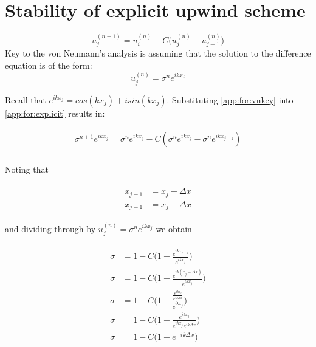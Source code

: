 \section{Stability of explicit upwind scheme}
	\begin{equation}
		\label{app:for:explicit}
		u_j^{(n+1)} = u_i^{(n)} - C\Big(u_j^{(n)} - u_{j-1}^{(n)}\Big)
	\end{equation}
	Key to the von Neumann's analysis is assuming that the solution to the difference equation is of the form:
	\begin{equation}
		\label{app:for:vnkey}
		u_j^{(n)} = \sigma^ne^{ikx_j}
	\end{equation}
	
	Recall that $e^{ikx_j} = cos(kx_j) + isin(kx_j)$. Substituting \ref{app:for:vnkey} into \ref{app:for:explicit} results in:
	
	\begin{align}
		\begin{split}
			\sigma ^{n+1}e^{ikx_j} = \sigma^{n}{e^{ikx_j}} - C(\sigma ^{n}e^{ikx_j} - \sigma ^{n}e^{ikx_{j-1}}) \\
		\end{split}
	\end{align}
	
	Noting that
	
	\begin{align}
		\begin{split}
			x_{j+1} &= x_j + \Delta x \\
			x_{j-1} &= x_j - \Delta x
		\end{split}
	\end{align}
	
	and dividing through by $u_j^{(n)} = \sigma^ne^{ikx_j}$ we obtain
	
	\begin{align}
		\begin{split}
			\sigma &= 1 - C\Big(1 - \frac{e^{ikx_{j-1}}}{e^{ikx_j}}\Big) \\
			\sigma &= 1 - C\Big(1 - \frac{e^{ik (x_j - \Delta x)}}{e^{ikx_j}}\Big) \\
			\sigma &= 1 - C\Big(1 - \frac{\frac{e^{ikx_j}}{e^{ik\Delta x}}}{e^{ikx_j}}\Big) \\
			\sigma &= 1 - C\Big(1 - \frac{e^{ikx_j}}{e^{ikx_j}e^{ik\Delta x}}\Big) \\
			\sigma &= 1 - C\Big(1 - e^{-ik\Delta x}\Big) \\
		\end{split}
	\end{align}
	

